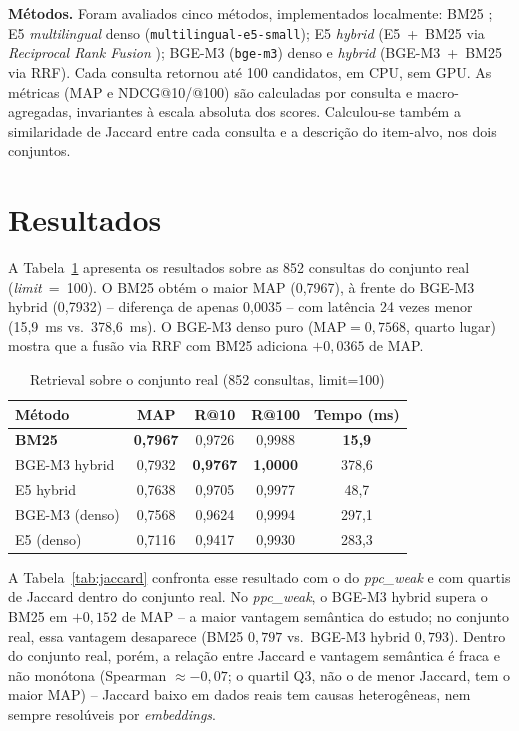 \documentclass[12pt]{article}
\begin{document}
\textbf{M\'etodos.} Foram avaliados cinco m\'etodos, implementados localmente: BM25 \cite{robertson:09}; E5 \emph{multilingual} denso \cite{wang:22} (\texttt{multilingual-e5-small}); E5 \emph{hybrid} (E5~+~BM25 via \emph{Reciprocal Rank Fusion} \cite{cormack:09}); BGE-M3 \cite{chen:24} (\texttt{bge-m3}) denso e \emph{hybrid} (BGE-M3~+~BM25 via RRF). Cada consulta retornou at\'e 100 candidatos, em CPU, sem GPU. As m\'etricas (MAP e NDCG@10/@100) s\~ao calculadas por consulta e macro-agregadas, invariantes \`a escala absoluta dos scores. Calculou-se tamb\'em a similaridade de Jaccard entre cada consulta e a descri\c{c}\~ao do item-alvo, nos dois conjuntos.

\section{Resultados}

A Tabela~\ref{tab:resultados} apresenta os resultados sobre as 852 consultas do conjunto real (\emph{limit}~=~100). O BM25 obt\'em o maior MAP (0,7967), \`a frente do BGE-M3 hybrid (0,7932) -- diferen\c{c}a de apenas 0,0035 -- com lat\^encia 24 vezes menor (15,9~ms vs.\ 378,6~ms). O BGE-M3 denso puro (MAP$=0{,}7568$, quarto lugar) mostra que a fus\~ao via RRF com BM25 adiciona $+0{,}0365$ de MAP.

\begin{table}[ht]
\centering
\small
\caption{Retrieval sobre o conjunto real (852 consultas, limit=100)}
\label{tab:resultados}
\begin{tabular}{|l|c|c|c|c|}
\hline
\textbf{M\'etodo} & \textbf{MAP} & \textbf{R@10} & \textbf{R@100} & \textbf{Tempo (ms)} \\
\hline
\textbf{BM25} & \textbf{0,7967} & 0,9726 & 0,9988 & \textbf{15,9} \\
\hline
BGE-M3 hybrid & 0,7932 & \textbf{0,9767} & \textbf{1,0000} & 378,6 \\
\hline
E5 hybrid & 0,7638 & 0,9705 & 0,9977 & 48,7 \\
\hline
BGE-M3 (denso) & 0,7568 & 0,9624 & 0,9994 & 297,1 \\
\hline
E5 (denso) & 0,7116 & 0,9417 & 0,9930 & 283,3 \\
\hline
\end{tabular}
\end{table}

A Tabela~\ref{tab:jaccard} confronta esse resultado com o do \emph{ppc\_weak} e com quartis de Jaccard dentro do conjunto real. No \emph{ppc\_weak}, o BGE-M3 hybrid supera o BM25 em $+0{,}152$ de MAP -- a maior vantagem sem\^antica do estudo; no conjunto real, essa vantagem desaparece (BM25 $0{,}797$ vs.\ BGE-M3 hybrid $0{,}793$). Dentro do conjunto real, por\'em, a rela\c{c}\~ao entre Jaccard e vantagem sem\^antica \'e fraca e n\~ao mon\'otona (Spearman $\approx-0{,}07$; o quartil Q3, n\~ao o de menor Jaccard, tem o maior MAP) -- Jaccard baixo em dados reais tem causas heterog\^eneas, nem sempre resol\'uveis por \emph{embeddings}.
\end{document}
